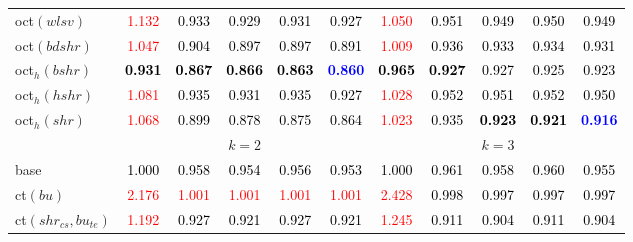 \begin{tabular}[t]{l|>{}cccc>{}c|ccccc}
oct$(wlsv)$ & \textcolor{red}{1.132} & \textcolor{black}{0.933} & \textcolor{black}{0.929} & \textcolor{black}{0.931} & \textcolor{black}{0.927} & \textcolor{red}{1.050} & \textcolor{black}{0.951} & \textcolor{black}{0.949} & \textcolor{black}{0.950} & \textcolor{black}{0.949}\\
oct$(bdshr)$ & \textcolor{red}{1.047} & \textcolor{black}{0.904} & \textcolor{black}{0.897} & \textcolor{black}{0.897} & \textcolor{black}{0.891} & \textcolor{red}{1.009} & \textcolor{black}{0.936} & \textcolor{black}{0.933} & \textcolor{black}{0.934} & \textcolor{black}{0.931}\\
oct$_h(bshr)$ & \textcolor{black}{\textbf{0.931}} & \textcolor{black}{\textbf{0.867}} & \textcolor{black}{\textbf{0.866}} & \textcolor{black}{\textbf{0.863}} & \textcolor{blue}{\textbf{0.860}} & \textcolor{black}{\textbf{0.965}} & \textcolor{black}{\textbf{0.927}} & \textcolor{black}{0.927} & \textcolor{black}{0.925} & \textcolor{black}{0.923}\\
oct$_h(hshr)$ & \textcolor{red}{1.081} & \textcolor{black}{0.935} & \textcolor{black}{0.931} & \textcolor{black}{0.935} & \textcolor{black}{0.927} & \textcolor{red}{1.028} & \textcolor{black}{0.952} & \textcolor{black}{0.951} & \textcolor{black}{0.952} & \textcolor{black}{0.950}\\
oct$_h(shr)$ & \textcolor{red}{1.068} & \textcolor{black}{0.899} & \textcolor{black}{0.878} & \textcolor{black}{0.875} & \textcolor{black}{0.864} & \textcolor{red}{1.023} & \textcolor{black}{0.935} & \textcolor{black}{\textbf{0.923}} & \textcolor{black}{\textbf{0.921}} & \textcolor{blue}{\textbf{0.916}}\\
\addlinespace[0.3em]
\multicolumn{1}{c}{} & \multicolumn{5}{c}{\textbf{$k = 2$}} & \multicolumn{5}{c}{\textbf{$k = 3$}}\\
base & \textcolor{black}{1.000} & \textcolor{black}{0.958} & \textcolor{black}{0.954} & \textcolor{black}{0.956} & \textcolor{black}{0.953} & \textcolor{black}{1.000} & \textcolor{black}{0.961} & \textcolor{black}{0.958} & \textcolor{black}{0.960} & \textcolor{black}{0.955}\\
ct$(bu)$ & \textcolor{red}{2.176} & \textcolor{red}{1.001} & \textcolor{red}{1.001} & \textcolor{red}{1.001} & \textcolor{red}{1.001} & \textcolor{red}{2.428} & \textcolor{black}{0.998} & \textcolor{black}{0.997} & \textcolor{black}{0.997} & \textcolor{black}{0.997}\\
ct$(shr_{cs}, bu_{te})$ & \textcolor{red}{1.192} & \textcolor{black}{0.927} & \textcolor{black}{0.921} & \textcolor{black}{0.927} & \textcolor{black}{0.921} & \textcolor{red}{1.245} & \textcolor{black}{0.911} & \textcolor{black}{0.904} & \textcolor{black}{0.911} & \textcolor{black}{0.904}\\

\end{tabular}
